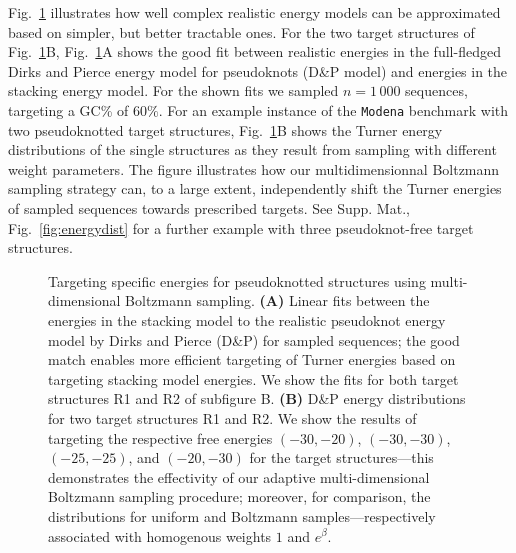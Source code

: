 \documentclass[]{bmcart}
\makeatletter
\newlength{\@aligneps}
\newcommand{\includegraphicstop}[2][]{%
\sbox{\@alignepsbox}{\texttt{[image: \#2]}}%
\setlength{\@aligneps}{-\ht\@alignepsbox}%
\addtolength{\@aligneps}{2ex}%
\raisebox{\@aligneps}{\usebox{\@alignepsbox}}}
\newcommand{\Nuc}[1]{{\sf #1}}
\newcommand{\Cb}{\Nuc{C}}
\newcommand{\Gb}{\Nuc{G}}
\newcommand{\GCb}{\Gb\Cb}
\makeatother
\begin{document}
Fig.~\ref{fig:energydist-pk} illustrates how well complex realistic energy models can be approximated based on simpler, but better tractable ones. For
the two target structures of Fig.~\ref{fig:energydist-pk}B,
Fig.~\ref{fig:energydist-pk}A shows the good fit between realistic
energies in the full-fledged Dirks and Pierce energy model for
pseudoknots (D\&P model) and energies in the stacking energy
model. For the shown fits we sampled $n=1\,000$ sequences, targeting a
\GCb\% of $60\%$.
%
For an example instance of the \texttt{Modena} benchmark with two
pseudoknotted target structures, Fig.~\ref{fig:energydist-pk}B shows
the Turner energy distributions of the single structures as they
result from sampling with different weight parameters. The figure
illustrates how our multidimensionnal Boltzmann sampling strategy can,
to a large extent, independently shift the Turner energies of sampled
sequences towards prescribed targets. See Supp. Mat.,
Fig.~\ref{fig:energydist} for a further example with three
pseudoknot-free target structures.

\begin{figure}[t]
  \begin{center}
    \includegraphicstop[width=0.97\textwidth]{Figs/energy_shift}\hfill
  \end{center}
  \caption{%
    Targeting specific energies for pseudoknotted structures using
    multi-dimensional Boltzmann sampling. \textbf{(A)} Linear fits between the
    energies in the stacking model to the realistic pseudoknot energy
    model by Dirks and Pierce (D\&P) for sampled sequences; the good
    match enables more efficient targeting of Turner energies based on
    targeting stacking model energies.  We show the fits for both
    target structures R1 and R2 of subfigure B.  \textbf{(B)} D\&P energy
    distributions for two target structures R1 and R2. We show the
    results of targeting the respective free energies $(-30,-20)$,
    $(-30,-30)$, $(-25,-25)$, and $(-20,-30)$ for the target
    structures---this demonstrates the effectivity of our adaptive
    multi-dimensional Boltzmann sampling procedure; moreover, for
    comparison, the distributions for uniform and Boltzmann
    samples---respectively associated with homogenous weights $1$ and
    $e^\beta$.
  }
  \label{fig:energydist-pk}
\end{figure}
\end{document}
